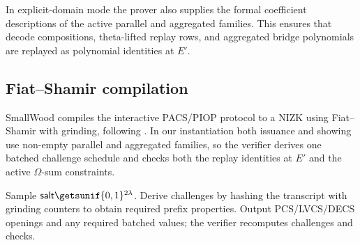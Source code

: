 In explicit-domain mode the prover also supplies the formal coefficient
descriptions of the active parallel and aggregated families. This ensures that
decode compositions, theta-lifted replay rows, and aggregated bridge
polynomials are replayed as polynomial identities at \(E'\).

\subsection{Fiat--Shamir compilation}
SmallWood compiles the interactive PACS/PIOP protocol to a NIZK using
Fiat--Shamir with grinding, following \cite{EPRINT:FenRiv25b}. In our
instantiation both issuance and showing use non-empty parallel and aggregated
families, so the verifier derives one batched challenge schedule and checks
both the replay identities at \(E'\) and the active \(\Omega\)-sum constraints.

\begin{algorithm}[H]
\caption{\textsf{PACS.ToNIZK} (Fiat--Shamir wrapper with grinding)}
\label{alg:pacs-tonizk}
\begin{algorithmic}[1]
\State Sample \(\textsf{salt}\getsunif\{0,1\}^{2\lambda}\).
\State Derive challenges by hashing the transcript with grinding counters to obtain required prefix properties.
\State Output PCS/LVCS/DECS openings and any required batched values; the verifier recomputes challenges and checks.
\end{algorithmic}
\end{algorithm}
